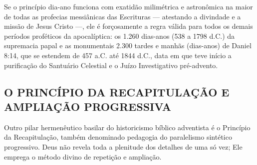 \documentclass[11pt,a4paper,openany]{book}
\begin{document}
Se o princípio dia-ano funciona com exatidão milimétrica e astronômica na maior de todas as profecias messiânicas das Escrituras — atestando a divindade e a missão de Jesus Cristo —, ele é forçosamente a regra válida para todos os demais períodos proféticos da apocalíptica: os 1.260 dias-anos (538 a 1798 d.C.) da supremacia papal e as monumentais 2.300 tardes e manhãs (dias-anos) de Daniel 8:14, que se estendem de 457 a.C. até 1844 d.C., data em que teve início a purificação do Santuário Celestial e o Juízo Investigativo pré-advento.



\subsection{O PRINCÍPIO DA RECAPITULAÇÃO E AMPLIAÇÃO PROGRESSIVA}


Outro pilar hermenêutico basilar do historicismo bíblico adventista é o Princípio da Recapitulação, também denominado pedagogia do paralelismo sintético progressivo. Deus não revela toda a plenitude dos detalhes de uma só vez; Ele emprega o método divino de repetição e ampliação.
\end{document}
